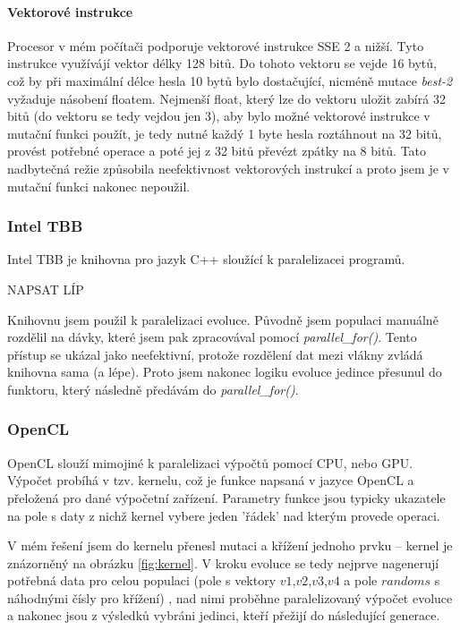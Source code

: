 \documentclass[11pt,a4paper]{scrartcl}
\begin{document}
	\paragraph{Vektorové instrukce} Procesor v mém počítači podporuje vektorové instrukce SSE 2 a nižší. Tyto instrukce využívájí vektor délky 128 bitů. Do tohoto vektoru se vejde 16 bytů, což by při maximální délce hesla 10 bytů bylo dostačující, nicméně mutace \textit{best-2} vyžaduje násobení floatem. Nejmenší float, který lze do vektoru uložit zabírá 32 bitů (do vektoru se tedy vejdou jen 3), aby bylo možné vektorové instrukce v mutační funkci použít, je tedy nutné každý 1 byte hesla roztáhnout na 32 bitů, provést potřebné operace a poté jej z 32 bitů převézt zpátky na 8 bitů. Tato nadbytečná režie způsobila neefektivnost vektorových instrukcí a proto jsem je v mutační funkci nakonec nepoužil.

	\subsubsection{Intel TBB}
	Intel TBB je knihovna pro jazyk C++ sloužící k paralelizacei programů.
	
	NAPSAT LÍP
	
	 Knihovnu jsem použil k paralelizaci evoluce. Původně jsem populaci manuálně rozdělil na dávky, které jsem pak zpracovával pomocí \textit{parallel\_for()}. Tento přístup se ukázal jako neefektivní, protože rozdělení dat mezi vlákny zvládá knihovna sama (a lépe). Proto jsem nakonec logiku evoluce jedince přesunul do funktoru, který následně předávám do \textit{parallel\_for()}.
	
	\subsubsection{OpenCL}
	OpenCL slouží mimojiné k paralelizaci výpočtů pomocí CPU, nebo GPU. Výpočet probíhá v tzv. kernelu, což je funkce napsaná v jazyce OpenCL a přeložená pro dané výpočetní zařízení. Parametry funkce jsou typicky ukazatele na pole s daty z nichž kernel vybere jeden 'řádek' nad kterým provede operaci.
	
	V mém řešení jsem do kernelu přenesl mutaci a křížení jednoho prvku -- kernel je znázorněný na obrázku \ref{fig:kernel}. V kroku evoluce se tedy nejprve nagenerují potřebná data pro celou populaci (pole s vektory $v1$,$v2$,$v3$,$v4$ a pole $randoms$ s náhodnými čísly pro křížení) , nad nimi proběhne paralelizovaný výpočet evoluce a nakonec jsou z výsledků vybráni jedinci, kteří přežijí do následující generace. 
	
\end{document}
